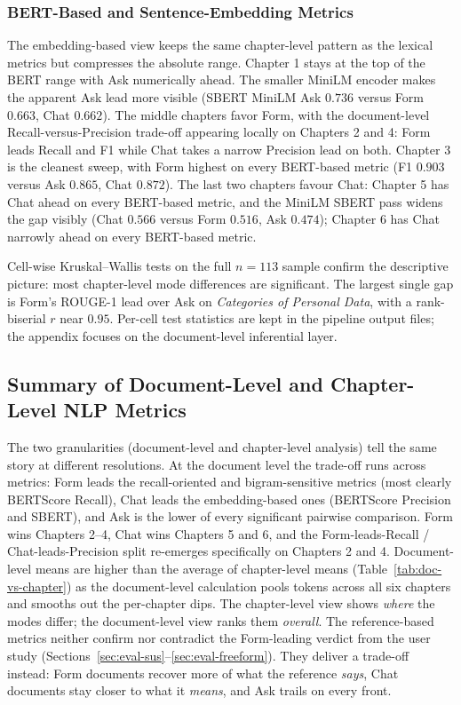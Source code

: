 \subsubsection{BERT-Based and Sentence-Embedding Metrics}
\label{ssec:nlp-chapter-bert}

The embedding-based view keeps the same chapter-level pattern as
the lexical metrics but compresses the absolute range. Chapter 1
stays at the top of the BERT range with Ask numerically ahead.
The smaller MiniLM encoder makes the apparent Ask
lead more visible (SBERT MiniLM Ask $0.736$ versus Form $0.663$,
Chat $0.662$). The middle chapters favor Form, with the
document-level Recall-versus-Precision
trade-off appearing locally on Chapters 2 and 4: Form leads
Recall and F1 while Chat takes a narrow Precision lead on both.
Chapter 3 is the cleanest sweep, with Form highest on every
BERT-based metric (F1 $0.903$ versus Ask $0.865$, Chat $0.872$).
The last two chapters favour Chat: Chapter 5 has Chat ahead on
every BERT-based metric, and the MiniLM SBERT pass widens the gap
visibly (Chat $0.566$ versus Form $0.516$, Ask $0.474$); Chapter
6 has Chat narrowly ahead on every BERT-based metric.

Cell-wise Kruskal--Wallis tests on the full $n = 113$ sample
confirm the descriptive picture: most chapter-level mode
differences are significant. The largest single gap is Form's
ROUGE-1 lead over Ask on \emph{Categories of Personal Data}, with
a rank-biserial $r$ near $0.95$. Per-cell test statistics are
kept in the pipeline output files; the appendix focuses on the
document-level inferential layer.

\subsection{Summary of Document-Level and Chapter-Level NLP Metrics}
\label{sec:eval-nlp-comparison}

The two granularities (document-level and chapter-level analysis)
tell the same story at different resolutions.
At the document level the trade-off runs across
metrics: Form leads the recall-oriented and bigram-sensitive
metrics (most clearly BERTScore Recall), Chat leads the
embedding-based ones (BERTScore Precision and SBERT), and Ask is
the lower of every significant pairwise comparison.
Form wins Chapters 2--4, Chat wins
Chapters 5 and 6, and the Form-leads-Recall / Chat-leads-Precision
split re-emerges specifically on Chapters 2 and 4.
Document-level means are higher than the average of chapter-level
means (Table~\ref{tab:doc-vs-chapter}) as the document-level
calculation pools tokens across all six chapters and smooths out
the per-chapter dips. The chapter-level view shows \emph{where}
the modes differ; the document-level view ranks them
\emph{overall}.
The reference-based metrics neither confirm nor contradict the
Form-leading verdict from the user study
(Sections~\ref{sec:eval-sus}--\ref{sec:eval-freeform}). They
deliver a trade-off instead: Form documents recover more of what
the reference \emph{says}, Chat documents stay closer to what it
\emph{means}, and Ask trails on every front.

